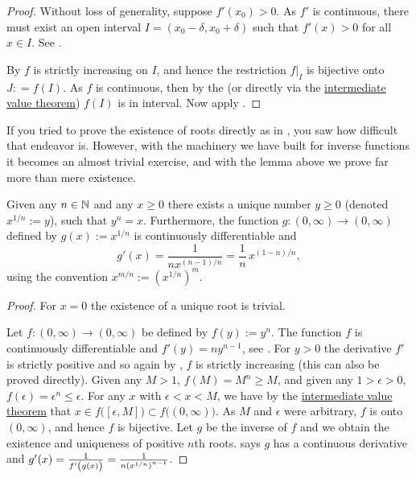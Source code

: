 \begin{proof}
Without loss of generality, suppose $f'(x_0) > 0$.  As $f'$ is
continuous, there must exist an open interval $I = (x_0-\delta,x_0+\delta)$ 
such that $f'(x) > 0$ for all $x \in I$.  See
.

By  $f$ is strictly increasing
on $I$, and hence the restriction $f|_{I}$ is bijective onto $J: = f(I)$.
As $f$ is continuous,
then by the
(or directly via the
\hyperref[IVT:thm]{intermediate value theorem})
$f(I)$ is in interval.
Now apply .
\end{proof}

If you tried to prove the existence of roots directly as in
, you saw
how difficult that endeavor is.  However, with the machinery we have built
for inverse functions it becomes
an almost trivial exercise, and with the lemma above we prove
far more than mere existence.

\begin{cor}
Given any $n \in {\mathbb{N}}$ and any $x \geq 0$ there exists a unique 
number $y \geq 0$ (denoted $x^{1/n} := y$), such that $y^n = x$.  Furthermore,
the function $g \colon (0,\infty) \to (0,\infty)$ defined by
$g(x) := x^{1/n}$ is continuously differentiable and
\begin{equation*}
g'(x) = \frac{1}{nx^{(n-1)/n}} = \frac{1}{n} \, x^{(1-n)/n} ,
\end{equation*}
using the convention $x^{m/n} := {(x^{1/n})}^{m}$.
\end{cor}

\begin{proof}
For $x=0$ the existence of a unique root is trivial.

Let $f \colon (0,\infty) \to (0,\infty)$ be defined by $f(y) := y^n$.
The function $f$ is continuously differentiable
and $f'(y) = ny^{n-1}$, see .  For $y > 0$ the derivative $f'$ is strictly positive
and so again by , $f$ is strictly
increasing (this can also be proved directly).
Given any $M > 1$, $f(M) = M^n \geq M$, and given any $1 > \epsilon > 0$,
$f(\epsilon) = \epsilon^n \leq \epsilon$.  For any $x$ with $\epsilon < x <
M$, we have by the
\hyperref[IVT:thm]{intermediate value theorem} that $x \in
f\bigl( [\epsilon,M] \bigr) \subset
f\bigl( (0,\infty) \bigr)$.  As $M$ and $\epsilon$ were arbitrary, $f$ is onto
$(0,\infty)$, and hence $f$ is bijective.
Let $g$ be the inverse of $f$ and we obtain
the existence and uniqueness of positive
$n$th roots.   says $g$ has a continuous
derivative and $g'(x) =
\frac{1}{f'\left(\vphantom{1^1_1}g(x)\right)} = \frac{1}{n {(x^{1/n})}^{n-1}}$.
\end{proof}

